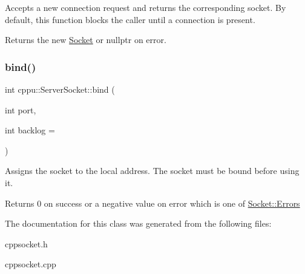 Accepts a new connection request and returns the corresponding socket. By default, this function blocks the caller until a connection is present. 

\begin{DoxyReturn}{Returns}
the new \mbox{\hyperlink{classcppu_1_1_socket}{Socket}} or nullptr on error. 
\end{DoxyReturn}
\mbox{\label{classcppu_1_1_server_socket_a255dfdccba51c7cdbcb6733c6c3f6ffa}} 
\subsubsection{\texorpdfstring{bind()}{bind()}}
{\footnotesize\ttfamily int cppu\+::\+Server\+Socket\+::bind (\begin{DoxyParamCaption}\item[{int}]{port,  }\item[{int}]{backlog = {} }\end{DoxyParamCaption})\hspace{0.3cm}{\ttfamily [virtual]}}



Assigns the socket to the local address. The socket must be bound before using it. 

\begin{DoxyReturn}{Returns}
0 on success or a negative value on error which is one of \mbox{\hyperlink{classcppu_1_1_socket_a49ea5cb079bd7ae97ecf7eb30c9d9e5f}{Socket\+::\+Errors}} 
\end{DoxyReturn}


The documentation for this class was generated from the following files\+:\begin{DoxyCompactItemize}
\item 
cppsocket.\+h\item 
cppsocket.\+cpp\end{DoxyCompactItemize}

